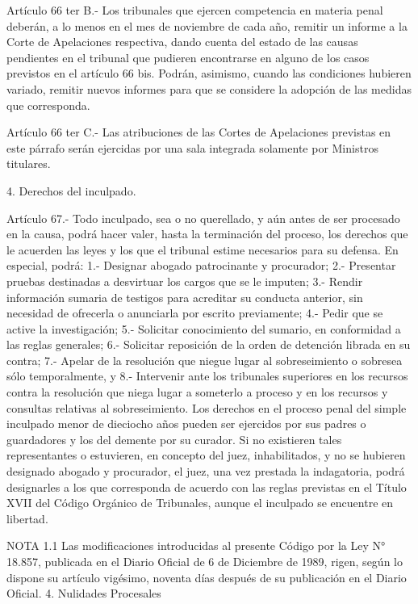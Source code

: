     Artículo 66 ter B.- Los tribunales que ejercen competencia en materia penal deberán, a lo menos en el mes de noviembre de cada año, remitir un informe a la Corte de Apelaciones respectiva, dando cuenta del estado de las causas pendientes en el tribunal que pudieren encontrarse en alguno de los casos previstos en el artículo 66 bis.
    Podrán, asimismo, cuando las condiciones hubieren variado, remitir nuevos informes para que se considere la adopción de las medidas que corresponda.

    Artículo 66 ter C.- Las atribuciones de las Cortes de Apelaciones previstas en este párrafo serán ejercidas por una sala integrada solamente por Ministros titulares.

    4. Derechos del inculpado.

    Artículo 67.- Todo inculpado, sea o no querellado, y aún antes de ser procesado en la causa, podrá hacer valer, hasta la terminación del proceso, los derechos que le acuerden las leyes y los que el tribunal estime necesarios para su defensa.
    En especial, podrá:
    1.- Designar abogado patrocinante y procurador;
    2.- Presentar pruebas destinadas a desvirtuar los cargos que se le imputen;
    3.- Rendir información sumaria de testigos para acreditar su conducta anterior, sin necesidad de ofrecerla o anunciarla por escrito previamente;
    4.- Pedir que se active la investigación;
    5.- Solicitar conocimiento del sumario, en conformidad a las reglas generales;
    6.- Solicitar reposición de la orden de detención librada en su contra;
    7.- Apelar de la resolución que niegue lugar al sobreseimiento o sobresea sólo temporalmente, y
    8.- Intervenir ante los tribunales superiores en los recursos contra la resolución que niega lugar a someterlo a proceso y en los recursos y consultas relativas al sobreseimiento.
    Los derechos en el proceso penal del simple inculpado menor de dieciocho años pueden ser ejercidos por sus padres o guardadores y los del demente por su curador.  Si no existieren tales representantes o estuvieren, en concepto del juez, inhabilitados, y no se hubieren designado abogado y procurador, el juez, una vez prestada la indagatoria, podrá designarles a los que corresponda de acuerdo con las reglas previstas en el Título XVII del Código Orgánico de Tribunales, aunque el inculpado se encuentre en libertad.





NOTA 1.1
    Las modificaciones introducidas al presente Código por la Ley N° 18.857, publicada en el Diario Oficial de 6 de Diciembre de 1989, rigen, según lo dispone su artículo vigésimo, noventa días después de su publicación en el Diario Oficial.
      4. Nulidades Procesales

